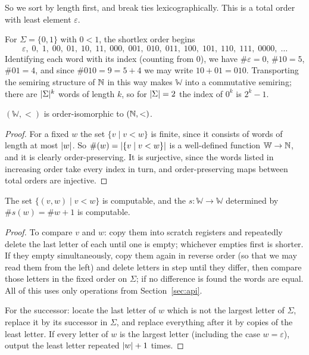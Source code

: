 \documentclass[a4paper]{scrartcl}
\newcommand{\WW}{\mathbb{W}}
\newcommand{\eps}{\varepsilon}
\begin{document}
So we sort by length first, and break ties lexicographically. This is a total order with least element $\eps$.

\begin{example}
	For $\Sigma = \{0,1\}$ with $0 < 1$, the shortlex order begins
	$$\eps,\; 0,\; 1,\; 00,\; 01,\; 10,\; 11,\; 000,\; 001,\; 010,\; 011,\; 100,\; 101,\; 110,\; 111,\; 0000,\; \dots$$
	Identifying each word with its index (counting from $0$), we have $\#\eps = 0$, $\#10 = 5$, $\#01 = 4$, and since $\#010 = 9 = 5 + 4$ we may write $10 + 01 = 010$. Transporting the semiring structure of $\mathbb{N}$ in this way makes $\WW$ into a commutative semiring; there are $\lvert\Sigma\rvert^k$ words of length $k$, so for $\lvert\Sigma\rvert=2$ the index of $0^k$ is $2^k - 1$.
\end{example}

\begin{theorem}
	$(\WW, <)$ is order-isomorphic to $(\mathbb{N},<)$.
\end{theorem}

\begin{proof}
	For a fixed $w$ the set $\{v \mid v < w\}$ is finite, since it consists of words of length at most $\lvert w\rvert$. So $\#(w) = \lvert\{v \mid v< w\}\rvert$ is a well-defined function $\WW\to\N$, and it is clearly order-preserving. It is surjective, since the words listed in increasing order take every index in turn, and order-preserving maps between total orders are injective.
\end{proof}

\begin{theorem}\label{thm:successorcomputable}
	The set $\{(v,w) \mid v < w\}$ is computable, and the  $s \colon \WW \to \WW$ determined by $\#s(w) = \#w + 1$ is computable.
\end{theorem}

\begin{proof}
	To compare $v$ and $w$: copy them into scratch registers and repeatedly delete the last letter of each until one is empty; whichever empties first is shorter. If they empty simultaneously, copy them again in reverse order (so that we may read them from the left) and delete letters in step until they differ, then compare those letters in the fixed order on $\Sigma$; if no difference is found the words are equal. All of this uses only operations from Section~\ref{sec:api}.

	For the successor: locate the last letter of $w$ which is not the largest letter of $\Sigma$, replace it by its successor in $\Sigma$, and replace everything after it by copies of the least letter. If every letter of $w$ is the largest letter (including the case $w = \eps$), output the least letter repeated $\lvert w\rvert+1$ times.
\end{proof}
\end{document}
